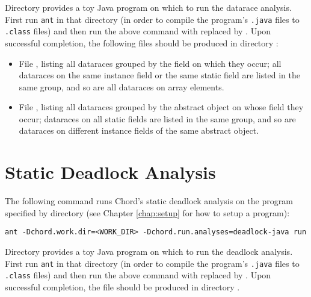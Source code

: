 Directory  provides a toy Java program on which to
run the datarace analysis.  First run {\tt ant} in that directory (in order to
compile the program's {\tt .java} files to {\tt .class} files) and then run the
above command with  replaced by .
Upon successful completion, the following files should be produced in directory
:

\begin{itemize}
\item
File , listing all dataraces grouped by the field on
which they occur; all dataraces on the same instance field or the same static
field are listed in the same group, and so are all dataraces on array elements.
\item
File , listing all dataraces grouped by the abstract
object on whose field they occur; dataraces on all static fields are listed in
the same group, and so are dataraces on different instance fields of the same
abstract object.
\end{itemize}

\section{Static Deadlock Analysis}

The following command runs Chord's static deadlock analysis on the
program specified by directory  (see Chapter \ref{chap:setup}
for how to setup a program):

\begin{framed}
\begin{verbatim}
ant -Dchord.work.dir=<WORK_DIR> -Dchord.run.analyses=deadlock-java run
\end{verbatim}
\end{framed}

Directory  provides a toy Java program on which to
run the deadlock analysis.  First run {\tt ant} in that directory (in order to
compile the program's {\tt .java} files to {\tt .class} files) and then run the
above command with  replaced by .
Upon successful completion, the file  should be produced in
directory .

